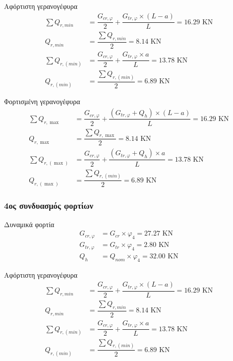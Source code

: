 Αφόρτιστη γερανογέφυρα
\begin{align*}
\sum{Q_{r,min}}   &= \dfrac{G_{cr,φ}}{2} + \dfrac{G_{tr,φ} \times (L - a)}{L} =  16.29 \text{ KN} \\
Q_{r,min}         &= \dfrac{\displaystyle\sum{Q_{r,min}}}{2}                  =   8.14  \text{ KN} \\
\sum{Q_{r,(min)}} &= \dfrac{G_{cr,φ}}{2} + \dfrac{G_{tr,φ} \times a}{L}       =  13.78 \text{ KN} \\
Q_{r,(min)}       &= \dfrac{\displaystyle\sum{Q_{r,(min)}}}{2}                =   6.89  \text{ KN}
\end{align*}

Φορτισμένη γερανογέφυρα
\begin{align*}
\sum{Q_{r,\max}}     &= \dfrac{G_{cr,φ}}{2} + \dfrac{(G_{tr,φ} + Q_h) \times (L - a)}{L}   =  16.29 \text{ KN} \\
Q_{r,\max}           &= \dfrac{\displaystyle\sum{Q_{r,\max}}}{2}                           =   8.14  \text{ KN} \\
\sum{Q_{r,(\max)}}   &= \dfrac{G_{cr,φ}}{2} + \dfrac{(G_{tr,φ} + Q_h) \times a}{L}         =  13.78 \text{ KN} \\
Q_{r,(\max)}         &= \dfrac{\displaystyle\sum{Q_{r,(min)}}}{2}                          =   6.89 \text{ KN}
\end{align*}

\subsubsection{4ος συνδυασμός φορτίων}
Δυναμικά  φορτία
\begin{align*}
G_{cr,φ}  &= G_{cr} \times φ_4    =  27.27 \text{ KN} \\
G_{tr,φ}  &= G_{tr} \times φ_4    =   2.80 \text{ KN} \\
Q_h       &= Q_{nom} \times φ_4   =  32.00   \text{ KN}
\end{align*}

Αφόρτιστη γερανογέφυρα
\begin{align*}
\sum{Q_{r,min}}   &= \dfrac{G_{cr,φ}}{2} + \dfrac{G_{tr,φ} \times (L - a)}{L} =  16.29 \text{ KN} \\
Q_{r,min}         &= \dfrac{\displaystyle\sum{Q_{r,min}}}{2}                  =   8.14  \text{ KN} \\
\sum{Q_{r,(min)}} &= \dfrac{G_{cr,φ}}{2} + \dfrac{G_{tr,φ} \times a}{L}       =  13.78 \text{ KN} \\
Q_{r,(min)}       &= \dfrac{\displaystyle\sum{Q_{r,(min)}}}{2}                =   6.89  \text{ KN}
\end{align*}


